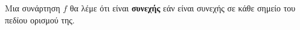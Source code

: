 Μια συνάρτηση $ f $ θα λέμε ότι είναι \textbf{συνεχής} εάν είναι συνεχής σε κάθε σημείο του πεδίου ορισμού της.
